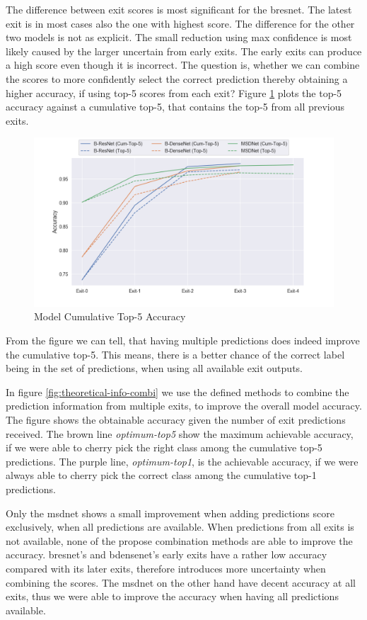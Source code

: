 The difference between exit scores is most significant for the \gls{bresnet}. The latest exit is in most cases also the one with highest score. The difference for the other two models is not as explicit. The small reduction using max confidence is most likely caused by the larger uncertain from early exits. The early exits can produce a high score even though it is incorrect. The question is, whether we can combine the scores to more confidently select the correct prediction thereby obtaining a higher accuracy, if using top-5 scores from each exit? Figure \ref{fig:top-5-cumulative} plots the top-5 accuracy against a cumulative top-5, that contains the top-5 from all previous exits. 

\begin{figure}
	\centering
	\includegraphics[width=.8\linewidth]{figures/edge/top5cumulative}
	\caption[Top-5 Cumulative]{Model Cumulative Top-5 Accuracy}
	\label{fig:top-5-cumulative}
\end{figure}

From the figure we can tell, that having multiple predictions does indeed improve the cumulative top-5. This means, there is a better chance of the correct label being in the set of predictions, when using all available exit outputs.

In figure \ref{fig:theoretical-info-combi} we use the defined methods to combine the prediction information from multiple exits, to improve the overall model accuracy. The figure shows the obtainable accuracy given the number of exit predictions received. The brown line \textit{optimum-top5} show the maximum achievable accuracy, if we were able to cherry pick the right class among the cumulative top-5 predictions. The purple line, \textit{optimum-top1}, is the achievable accuracy, if we were always able to cherry pick the correct class among the cumulative top-1 predictions. 

Only the \gls{msdnet} shows a small improvement when adding predictions score exclusively, when all predictions are available. When predictions from all exits is not available, none of the propose combination methods are able to improve the accuracy. \gls{bresnet}'s and \gls{bdensenet}'s early exits have a rather low accuracy compared with its later exits, therefore introduces more uncertainty when combining the scores. The \gls{msdnet} on the other hand have decent accuracy at all exits, thus we were able to improve the accuracy when having all predictions available.

